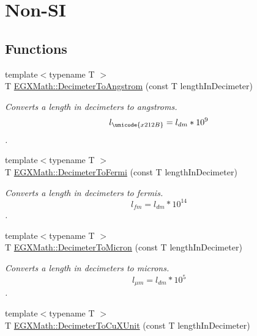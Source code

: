\hypertarget{group___e_g_x_math-_conversions-_length_conversions-_s_i-_decimeter-_non-_s_i}{}\section{Non-\/\+SI}
\label{group___e_g_x_math-_conversions-_length_conversions-_s_i-_decimeter-_non-_s_i}
\subsection*{Functions}
\begin{DoxyCompactItemize}
\item 
{\footnotesize template$<$typename T $>$ }\\T \mbox{\hyperlink{group___e_g_x_math-_conversions-_length_conversions-_s_i-_decimeter-_non-_s_i_gaffa5876e4f15bc859c369e8bfb9e4183}{E\+G\+X\+Math\+::\+Decimeter\+To\+Angstrom}} (const T length\+In\+Decimeter)
\begin{DoxyCompactList}\small\item\em Converts a length in decimeters to angstroms. \[ l_{\unicode{x212B}}=l_{dm} * 10^{9} \]. \end{DoxyCompactList}\item 
{\footnotesize template$<$typename T $>$ }\\T \mbox{\hyperlink{group___e_g_x_math-_conversions-_length_conversions-_s_i-_decimeter-_non-_s_i_ga2163b07afe9c89c1a1150516f615ef2a}{E\+G\+X\+Math\+::\+Decimeter\+To\+Fermi}} (const T length\+In\+Decimeter)
\begin{DoxyCompactList}\small\item\em Converts a length in decimeters to fermis. \[ l_{fm}=l_{dm} * 10^{14} \]. \end{DoxyCompactList}\item 
{\footnotesize template$<$typename T $>$ }\\T \mbox{\hyperlink{group___e_g_x_math-_conversions-_length_conversions-_s_i-_decimeter-_non-_s_i_gaebafc6e167156bb5158e5d335b25334b}{E\+G\+X\+Math\+::\+Decimeter\+To\+Micron}} (const T length\+In\+Decimeter)
\begin{DoxyCompactList}\small\item\em Converts a length in decimeters to microns. \[ l_{\mu m}=l_{dm} * 10^{5} \]. \end{DoxyCompactList}\item 
{\footnotesize template$<$typename T $>$ }\\T \mbox{\hyperlink{group___e_g_x_math-_conversions-_length_conversions-_s_i-_decimeter-_non-_s_i_gab595b2398e8e838922b4591308466e87}{E\+G\+X\+Math\+::\+Decimeter\+To\+Cu\+X\+Unit}} (const T length\+In\+Decimeter)

\end{DoxyCompactItemize}
